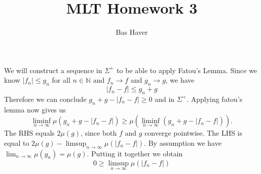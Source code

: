 \documentclass{article}
\title{MLT Homework 3}
\author{Bas Haver}
\begin{document}
We will construct a sequence in $\Sigma ^+$ to be able to apply Fatou's Lemma. Since we know $|f_n| \leq g_n$ for all $n\in \mathbb{N}$ and $f_n \to f$ and $g_n \to g$, we have $$|f_n-f|\leq g_n +g$$Therefore we can conclude $g_n + g -|f_n-f| \geq 0$ and in $\Sigma ^+$. Applying fatou's lemma now gives us $$\liminf _{n \to \infty } \mu (g_n+g-|f_n-f|) \geq \mu (\liminf _{n \to \infty } (g_n + g - |f_n - f| )).$$
The RHS equals 2$\mu (g)$, since both $f$ and $g$ converge pointwise. The LHS is equal to $2\mu (g) - \limsup _{n\to \infty }\mu (|f_n-f|)$. By assumption we have $\lim _{n \to \infty} \mu (g_n)=\mu (g)$. Putting it together we obtain $$0\geq \limsup _{n \to \infty } \mu (|f_n - f|)$$
\maketitle
\end{document}

